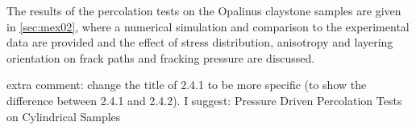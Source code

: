 The results of the percolation tests on the Opalinus claystone samples are given in \ref{sec:mex02}, where a numerical simulation and comparison to the experimental data are provided and the effect of stress distribution, anisotropy and layering orientation on frack paths and fracking pressure are discussed. 

extra comment: change the title of 2.4.1 to be more specific (to show the difference between 2.4.1 and 2.4.2). I suggest: Pressure Driven Percolation Tests on Cylindrical Samples